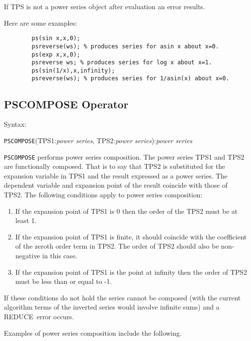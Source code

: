 \documentclass[11pt,letterpaper]{book}
\newcommand{\REDUCE}{REDUCE}
\begin{document}
If TPS is not a power series object after evaluation an error results.

\noindent Here are some examples:
{\small\begin{verbatim}
        ps(sin x,x,0);
        psreverse(ws); % produces series for asin x about x=0.
        ps(exp x,x,0);
        psreverse ws; % produces series for log x about x=1.
        ps(sin(1/x),x,infinity);
        psreverse(ws); % produces series for 1/asin(x) about x=0.
\end{verbatim}}

\subsection{PSCOMPOSE Operator}

Syntax:

\hspace*{2em} {\tt PSCOMPOSE}(TPS1:{\em power series}, TPS2:{\em power series}):{\em power series}

{\tt PSCOMPOSE} performs power series composition.
The power series TPS1 and TPS2 are functionally composed.
That is to say that TPS2 is substituted for the expansion
variable in TPS1 and the result expressed as a power series. The
dependent variable and expansion point of the result coincide with
those of TPS2.  The following conditions apply to power series
composition:

\begin{enumerate}
\item If the expansion point of TPS1 is 0 then the order of the
TPS2 must be at least 1.

\item If the expansion point of TPS1 is finite, it should
coincide with the coefficient of the zeroth order term in TPS2.
The order of TPS2 should also be non-negative in this case.

\item If the expansion point of TPS1 is the point at infinity
then the order of TPS2 must be less than or equal to -1.

\end{enumerate}

If these conditions do not hold the series cannot be composed (with
the current algorithm terms of the inverted series would involve
infinite sums) and a \REDUCE\ error occurs.

\noindent Examples of power series composition include the following.
\end{document}
